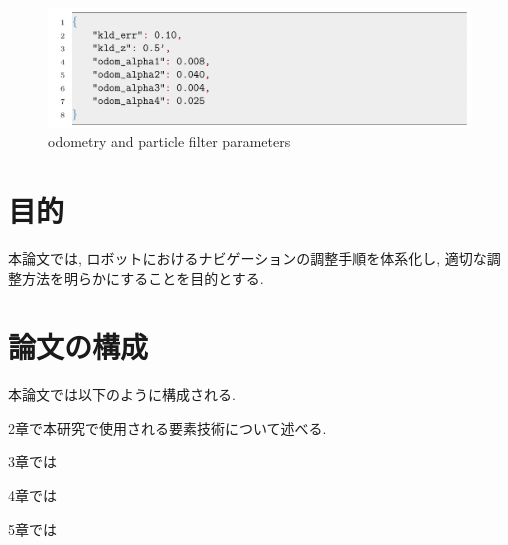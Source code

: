 \begin{figure}[hbtp]
  \centering
 \includegraphics[keepaspectratio, scale=0.3]
      {images/senkou_2.png}
 \caption{odometry and particle filter parameters}
 \label{Fig:odometry and particle filter parameters}
\end{figure}
\newpage
\section{目的}
本論文では, ロボットにおけるナビゲーションの調整手順を体系化し, 適切な調整方法を明らかにすることを目的とする. 

\section{論文の構成}
本論文では以下のように構成される. 

2章で本研究で使用される要素技術について述べる. 

3章では

4章では

5章では

\newpage
